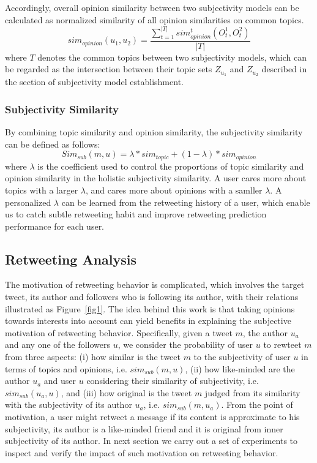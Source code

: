 \documentclass[letterpaper]{article}
\begin{document}
Accordingly, overall opinion similarity between two subjectivity models can be calculated as normalized similarity of all opinion similarities on common topics. 
\begin{equation}
sim_{opinion}(u_{1},u_{2})=\dfrac{\sum_{t=1}^{|T|}sim_{opinion}^{t}(O_{t}^{1},O_{t}^{2})}{|T|}
\end{equation}
where $ T $ denotes the common topics between two subjectivity models, which can be regarded as the intersection between their topic sets $ Z_{u_{1}} $ and $ Z_{u_{2}} $ described in the section of subjectivity model establishment. 

\subsubsection{Subjectivity Similarity}

By combining topic similarity and opinion similarity, the subjectivity similarity can be defined as follows:
\begin{equation}
\label{subsim}
Sim_{sub} \left( m,u \right) = \lambda * sim_{topic}+\left( 1-\lambda \right)*sim_{opinion}
\end{equation}
where $ \lambda $ is the coefficient used to control the proportions of topic similarity and opinion similarity in the holistic subjectivity similarity. 
A user cares more about topics with a larger $ \lambda $, and cares more about opinions with a samller $ \lambda $. 
A personalized $ \lambda $ can be learned from the retweeting history of a user, which enable us to catch subtle retweeting habit and improve retweeting prediction performance for each user. 

\subsection{Retweeting Analysis}
\label{analysis}

The motivation of retweeting behavior is complicated, which involves the target tweet, its author and followers who is following its author, with their relations illustrated as Figure~\ref{fig1}. 
The idea behind this work is that taking opinions towards interests into account can yield benefits in explaining the subjective motivation of retweeting behavior. 
Specifically, given a tweet $ m $, the author $ u_{a} $ and any one of the followers $ u $, we consider the probability of user $ u $ to rewteet $ m $ from three aspects: 
(i) how similar is the tweet $ m $ to the subjectivity of user $ u $ in terms of topics and opinions, i.e. $ sim_{sub} \left( m,u \right) $, (ii) how like-minded are the author $ u_{a} $ and user $ u $ considering their similarity of subjectivity, i.e. $ sim_{sub}\left( u_{a},u \right) $, and (iii) how original is the tweet $ m $ judged from its similarity with the subjectivity of its author $ u_{a} $, i.e. $ sim_{sub}\left( m,u_{a} \right)  $. 
From the point of motivation, a user might retweet a message if its content is approximate to his subjectivity, its author is a like-minded friend and it is original from inner subjectivity of its author. 
In next section we carry out a set of experiments to inspect and verify the impact of such motivation on retweeting behavior. 
\end{document}
